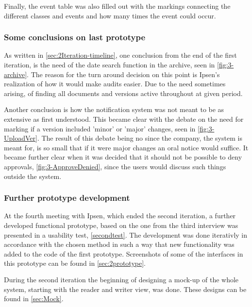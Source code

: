 Finally, the event table was also filled out with the markings connecting the different classes and events and how many times the event could occur.

\subsubsection*{Some conclusions on last prototype}
As written in \cref{sec:2Iteration-timeline}, one conclusion from the end of the first iteration, is the need of the date search function in the archive, seen in \cref{fig:3-archive}.
The reason for the turn around decision on this point is Ipsen's realization of how it would make audits easier.
Due to the need sometimes arising, of finding all documents and versions active throughout at given period.

Another conclusion is how the notification system was not meant to be as extensive as first understood. 
This became clear with the debate on the need for marking if a version included 'minor' or 'major' changes, seen in \cref{fig:3-UploadVer}.
The result of this debate being no since the company, the system is meant for, is so small that if it were major changes an oral notice would suffice.
It became further clear when it was decided that it should not be possible to deny approvals, \cref{fig:3-ApproveDenied}, since the users would discuss such things outside the system.

\subsubsection*{Further prototype development}
At the fourth meeting with Ipsen, which ended the second iteration, a further developed functional prototype, based on the one from the third interview was presented in a usability test, \cref{secondtest}.
The development was done iterativly in accordance with the chosen method in such a way that new functionality was added to the code of the first prototype.
Screenshots of some of the interfaces in this prototype can be found in \cref{sec:2prototype}.

During the second iteration the beginning of designing a mock-up of the whole system, starting with the reader and writer view, was done. 
These designs can be found in \cref{sec:Mock}.
